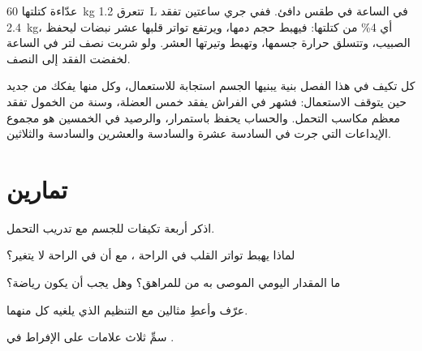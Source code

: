 \begin{example}\label{ex:g10:sport-and-health:water}
عدّاءة كتلتها \qty{60}{kg} تتعرق \qty{1.2}{L} في الساعة في طقس دافئ.
ففي جري ساعتين تفقد \qty{2.4}{kg}، أي 4\% من كتلتها: فيهبط حجم دمها،
ويرتفع تواتر قلبها عشر نبضات ليحفظ الصبيب، وتتسلق حرارة جسمها، وتهبط
وتيرتها العشر. ولو شربت نصف لتر في الساعة لخفضت الفقد إلى النصف.
\end{example}

\begin{remark}\label{rem:g10:sport-and-health:account}
كل تكيف في هذا الفصل بنية يبنيها الجسم استجابة للاستعمال، وكل منها
يفكك من جديد حين يتوقف الاستعمال: فشهر في الفراش يفقد خمس العضلة، وسنة
من الخمول تفقد معظم مكاسب التحمل. والحساب يحفظ باستمرار، والرصيد في
الخمسين هو مجموع الإيداعات التي جرت في السادسة عشرة والسادسة والعشرين
والسادسة والثلاثين.
\end{remark}

\section{تمارين}

\begin{exercise}[$\star$]\label{exo:g10:sport-and-health:1}
اذكر أربعة تكيفات للجسم مع تدريب التحمل.
\end{exercise}

\begin{exercise}[$\star$]\label{exo:g10:sport-and-health:2}
لماذا يهبط تواتر القلب في الراحة ، مع أن  في
الراحة لا يتغير؟
\end{exercise}

\begin{exercise}[$\star$]\label{exo:g10:sport-and-health:3}
ما المقدار اليومي الموصى به من  للمراهق؟ وهل يجب أن يكون
رياضة؟
\end{exercise}

\begin{exercise}[$\star$]\label{exo:g10:sport-and-health:4}
عرّف  وأعطِ مثالين مع التنظيم الذي يلغيه كل منهما.
\end{exercise}

\begin{exercise}[$\star$]\label{exo:g10:sport-and-health:5}
سمِّ ثلاث علامات على الإفراط في .
\end{exercise}

